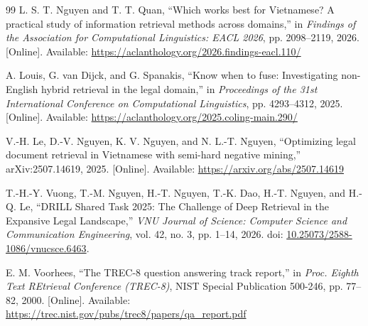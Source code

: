 \begin{thebibliography}{99}
L. S. T. Nguyen and T. T. Quan, ``Which works best for Vietnamese? A practical study of information retrieval methods across domains,'' in \emph{Findings of the Association for Computational Linguistics: EACL 2026}, pp. 2098--2119, 2026. [Online]. Available: \href{https://aclanthology.org/2026.findings-eacl.110/}{https://aclanthology.org/2026.findings-eacl.110/}

A. Louis, G. van Dijck, and G. Spanakis, ``Know when to fuse: Investigating non-English hybrid retrieval in the legal domain,'' in \emph{Proceedings of the 31st International Conference on Computational Linguistics}, pp. 4293--4312, 2025. [Online]. Available: \href{https://aclanthology.org/2025.coling-main.290/}{https://aclanthology.org/2025.coling-main.290/}

V.-H. Le, D.-V. Nguyen, K. V. Nguyen, and N. L.-T. Nguyen, ``Optimizing legal document retrieval in Vietnamese with semi-hard negative mining,'' arXiv:2507.14619, 2025. [Online]. Available: \href{https://arxiv.org/abs/2507.14619}{https://arxiv.org/abs/2507.14619}

T.-H.-Y. Vuong, T.-M. Nguyen, H.-T. Nguyen, T.-K. Dao, H.-T. Nguyen, and H.-Q. Le, ``DRILL Shared Task 2025: The Challenge of Deep Retrieval in the Expansive Legal Landscape,'' \emph{VNU Journal of Science: Computer Science and Communication Engineering}, vol. 42, no. 3, pp. 1--14, 2026. doi: \href{https://doi.org/10.25073/2588-1086/vnucsce.6463}{10.25073/2588-1086/vnucsce.6463}.

E. M. Voorhees, ``The TREC-8 question answering track report,'' in \emph{Proc. Eighth Text REtrieval Conference (TREC-8)}, NIST Special Publication 500-246, pp. 77--82, 2000. [Online]. Available: \href{https://trec.nist.gov/pubs/trec8/papers/qa_report.pdf}{https://trec.nist.gov/pubs/trec8/papers/qa\_report.pdf}

\end{thebibliography}
